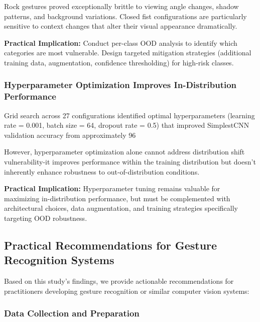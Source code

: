 \documentclass[12pt,a4paper]{article}
\begin{document}
Rock gestures proved exceptionally brittle to viewing angle changes, shadow patterns, and background variations. Closed fist configurations are particularly sensitive to context changes that alter their visual appearance dramatically.

\textbf{Practical Implication:} Conduct per-class OOD analysis to identify which categories are most vulnerable. Design targeted mitigation strategies (additional training data, augmentation, confidence thresholding) for high-risk classes.

\subsubsection{Hyperparameter Optimization Improves In-Distribution Performance}

Grid search across 27 configurations identified optimal hyperparameters (learning rate = 0.001, batch size = 64, dropout rate = 0.5) that improved SimplestCNN validation accuracy from approximately 96%

However, hyperparameter optimization alone cannot address distribution shift vulnerability-it improves performance within the training distribution but doesn't inherently enhance robustness to out-of-distribution conditions.

\textbf{Practical Implication:} Hyperparameter tuning remains valuable for maximizing in-distribution performance, but must be complemented with architectural choices, data augmentation, and training strategies specifically targeting OOD robustness.

\subsection{Practical Recommendations for Gesture Recognition Systems}

Based on this study's findings, we provide actionable recommendations for practitioners developing gesture recognition or similar computer vision systems:

\subsubsection{Data Collection and Preparation}
\end{document}
